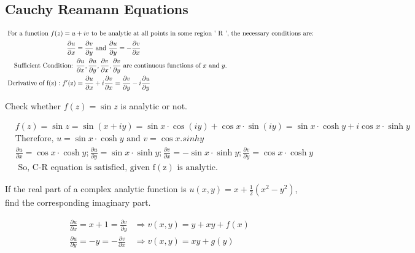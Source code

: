 \begin{note}
	\subsection{Cauchy Reamann Equations}
	\begin{align*}
	\intertext{	For a function $f(z)=u+i v$ to be analytic at all points in some region ' $\mathrm{R}$ ', the necessary conditions are:}
		\frac{\partial u}{\partial x}&=\frac{\partial v}{\partial y} \text { and } \frac{\partial u}{\partial y}=-\frac{\partial v}{\partial x}\\
		\text{Sufficient Condition: }&\frac{\partial u}{\partial x}, \frac{\partial u}{\partial y}, \frac{\partial v}{\partial x}, \frac{\partial v}{\partial y}\text{ are continuous functions of $x$ and $y$.}\\
		\text{	Derivative of }\mathrm{f}(\mathrm{z}): f^{\prime}(\mathrm{z})&=\frac{\partial u}{\partial x}+i \frac{\partial v}{\partial x}=\frac{\partial v}{\partial y}-i \frac{\partial u}{\partial y}
	\end{align*}
	\begin{exercise}
		Check whether $f(z)=\sin z$ is analytic or not.
	\end{exercise}
	\begin{answer}
		\begin{align*}
		&f(z)=\sin z=\sin (x+i y)=\sin x \cdot \cos (i y)+\cos x \cdot \sin (i y)=\sin x \cdot \cosh y+i \cos x \cdot \sinh y\\
		&\text{Therefore, }u=\sin x \cdot \cosh y\text{ and }v=\cos x.sinhy \\
		&\frac{\partial u}{\partial x}=\cos x \cdot \cosh y ; \frac{\partial u}{\partial y}=\sin x \cdot \sinh y ; \frac{\partial v}{\partial x}=-\sin x \cdot \sinh y ; \frac{\partial v}{\partial y}=\cos x \cdot \cosh y\\
		&\text { So, C-R equation is satisfied, given } \mathrm{f}(\mathrm{z}) \text { is analytic. }
		\end{align*}
	\end{answer}
	\begin{exercise}
		If the real part of a complex analytic function is $u(x, y)=x+\frac{1}{2}\left(x^{2}-y^{2}\right)$, find the corresponding imaginary part.
	\end{exercise}
	\begin{answer}
		\begin{align*}
		\frac{\partial u}{\partial x}=x+1=\frac{\partial v}{\partial y} & \Rightarrow v(x, y)=y+x y+f(x) \\
		\frac{\partial u}{\partial y}=-y=-\frac{\partial v}{\partial x} & \Rightarrow v(x, y)=x y+g(y)\\

\end{align*}
\end{answer}
\end{note}

